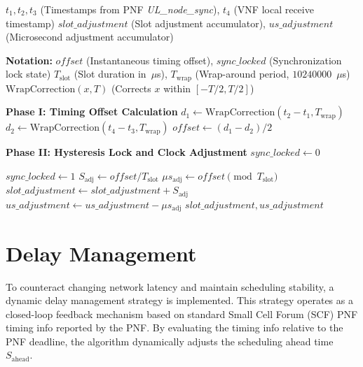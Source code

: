 \documentclass[../my_ntust_thesis.tex]{subfiles}
\begin{document}
\begin{algorithm}[H]
\caption{Node sync}
\label{alg:node_sync_simplified}
\small
\begin{algorithmic}[1]
\algrenewcommand{}
\algrenewcommand{}
\Require $t_1, t_2, t_3$ (Timestamps from PNF \textit{UL\_node\_sync}), $t_4$ (VNF local receive timestamp)
\Ensure $\mathit{slot\_adjustment}$ (Slot adjustment accumulator), $\mathit{us\_adjustment}$ (Microsecond adjustment accumulator)

\Statex \textbf{Notation:} 
\Statex $\mathit{offset}$ (Instantaneous timing offset), $\mathit{sync\_locked}$ (Synchronization lock state)
\Statex $T_{\mathrm{slot}}$ (Slot duration in~$\mu$s), $T_{\mathrm{wrap}}$ (Wrap-around period, $10240000$~$\mu$s)
\Statex $\text{WrapCorrection}(x, T)$ (Corrects $x$ within $[-T/2, T/2]$)

\Statex \textbf{Phase I: Timing Offset Calculation}
\State $d_1 \gets \text{WrapCorrection}(t_2 - t_1, T_{\mathrm{wrap}})$
\State $d_2 \gets \text{WrapCorrection}(t_4 - t_3, T_{\mathrm{wrap}})$
\State $\mathit{offset} \gets (d_1 - d_2) / 2$

\Statex \textbf{Phase II: Hysteresis Lock and Clock Adjustment}
    \State $\mathit{sync\_locked} \gets 0$ 
\EndIf

        \State $\mathit{sync\_locked} \gets 1$ 
    \Else
        \State $S_{\mathrm{adj}} \gets \mathit{offset} / T_{\mathrm{slot}}$ 
        \State $\mu s_{\mathrm{adj}} \gets \mathit{offset} \pmod{T_{\mathrm{slot}}}$
        \State $\mathit{slot\_adjustment} \gets \mathit{slot\_adjustment} + S_{\mathrm{adj}}$
        \State $\mathit{us\_adjustment} \gets \mathit{us\_adjustment} - \mu s_{\mathrm{adj}}$
    \EndIf
\EndIf
\State \Return $\mathit{slot\_adjustment}, \mathit{us\_adjustment}$
\end{algorithmic}
\end{algorithm}

\section{Delay Management}
\label{subsec:delay_management}

To counteract changing network latency and maintain scheduling stability, a dynamic delay management strategy is implemented. This strategy operates as a closed-loop feedback mechanism based on standard Small Cell Forum (SCF) PNF timing info reported by the PNF. By evaluating the timing info relative to the PNF deadline, the algorithm dynamically adjusts the scheduling ahead time $S_{\mathrm{ahead}}$.
\end{document}
